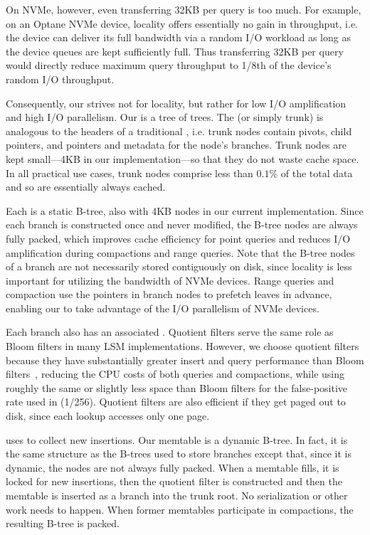 On NVMe, however, even transferring 32KB per query is too much.  For
example, on an Optane NVMe device, locality offers essentially no gain
in throughput, i.e. the device can deliver its full bandwidth via a
random I/O workload as long as the device queues are kept sufficiently
full.  Thus transferring 32KB per query would directly reduce maximum
query throughput to 1/8th of the device's random I/O throughput.

Consequently, our \datastruct strives not for locality, but rather for
low I/O amplification and high I/O parallelism.  Our \datastruct is a
tree of trees. The  (or simply trunk) is analogous to
the headers of a traditional \bet, i.e. trunk nodes contain pivots,
child pointers, and pointers and metadata for the node's branches.
Trunk nodes are kept small---4KB in our implementation---so that they
do not waste cache space. In all practical use cases, trunk nodes
comprise less than $0.1\%$ of the total data and so are essentially
always cached.

Each  is a static B-tree, also with 4KB nodes in our
current implementation. Since each branch is constructed once and
never modified, the B-tree nodes are always fully packed, which
improves cache efficiency for point queries and reduces I/O
amplification during compactions and range queries.  Note that the
B-tree nodes of a branch are not necessarily stored contiguously on
disk, since locality is less important for utilizing the bandwidth of
NVMe devices. Range queries and compaction use the pointers in branch
nodes to prefetch leaves
in advance, enabling our \datastruct to take advantage of the I/O
parallelism of NVMe devices.

Each branch also has an associated . Quotient filters
serve the same role as Bloom filters in many LSM implementations.  However,
we choose quotient filters because they have substantially greater insert and
query performance than Bloom
filters~\cite{DBLP:journals/pvldb/BenderFJKKMMSSZ12}, reducing the CPU costs of
both queries and compactions, while using roughly the same or slightly less
space than Bloom filters for the false-positive rate used in \sysname (1/256).
Quotient filters are also efficient if they get paged out to disk, since each
lookup accesses only one page.

\sysname uses  to collect new insertions.
Our memtable is a dynamic B-tree.  In fact, it is the same structure
as the B-trees used to store branches except that, since it is
dynamic, the nodes are not always fully packed.  When a memtable
fills, it is locked for new insertions, then the quotient filter is
constructed and then the memtable is inserted as a branch into the
trunk root.  No serialization or other work needs to happen.  When
former memtables participate in compactions, the resulting B-tree is
packed.

